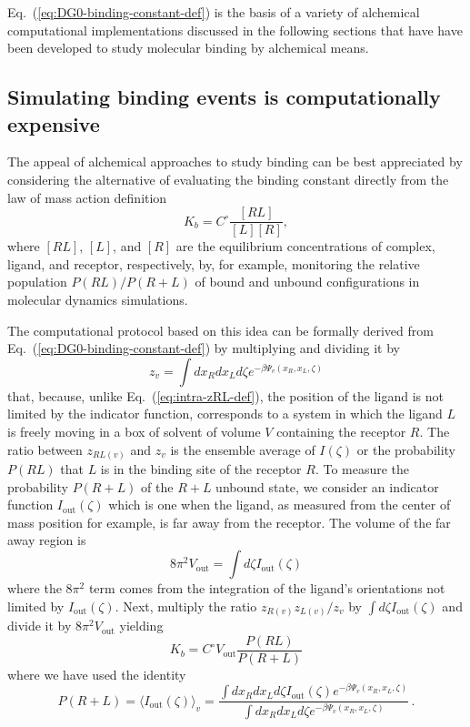 \documentclass[9pt,bestpractices]{livecoms}
\begin{document}
Eq.~(\ref{eq:DG0-binding-constant-def}) is the basis of a variety of alchemical computational implementations discussed in the following sections that have have been developed to study molecular binding by alchemical means.

\subsection{Simulating binding events is computationally expensive}

The appeal of alchemical approaches to study binding can be best appreciated by considering the alternative of evaluating the binding constant directly from the law of mass action definition
\begin{equation}\label{eq:law-mass-action}
 K_b = C^{\circ}\frac{[RL]}{[L][R]},
\end{equation}
where $[RL]$, $[L]$, and $[R]$ are the equilibrium concentrations of complex, ligand, and receptor, respectively, by, for example, monitoring the relative population $P(RL)/P(R+L)$ of bound and unbound configurations in molecular dynamics simulations.~\cite{jong2011determining,pan2017quantitative}

The computational protocol based on this idea can be formally derived from Eq.~(\ref{eq:DG0-binding-constant-def}) by multiplying and dividing it by
\begin{equation}
z_v = \int dx_R dx_L d\zeta e^{-\beta \Psi_v(x_R, x_L, \zeta)}
\end{equation}
that, because, unlike Eq.~(\ref{eq:intra-zRL-def}), the position of the ligand is not limited by the indicator function, corresponds to a system in which the ligand $L$ is freely moving in a box of solvent of volume $V$ containing the receptor $R$. The ratio between $z_{RL(v)}$ and $z_v$ is the ensemble average of $I(\zeta)$ or the probability $P(RL)$ that $L$ is in the binding site of the receptor $R$. To measure the probability $P(R+L)$ of the $R+L$ unbound state, we consider an indicator function $I_{\mathrm{out}}(\zeta)$ which is one when the ligand, as measured from the center of mass position for example, is far away from the receptor. The volume of the far away region is
\begin{equation}
8 \pi^2 V_{\mathrm{out}} = \int d\zeta I_{\mathrm{out}}(\zeta)
\end{equation}
where the $8 \pi^2$ term comes from the integration of the ligand's orientations not limited by $I_{\mathrm{out}}(\zeta)$. Next, multiply the ratio $z_{R(v)} z_{L(v)}/z_v$ by $\int d\zeta I_{\mathrm{out}}(\zeta)$ and divide it by $8 \pi^2 V_{\mathrm{out}}$ yielding
\begin{equation}
K_b = C^\circ V_{\mathrm{out}} \frac{P(RL)}{P(R+L)}
\end{equation}
where we have used the identity
\begin{equation}
P(R+L) = \langle I_{\mathrm{out}}(\zeta) \rangle_v = \frac{\int dx_R dx_L d\zeta I_{\mathrm{out}}(\zeta) e^{-\beta \Psi_v(x_R, x_L, \zeta)}}{\int dx_R dx_L d\zeta e^{-\beta \Psi_v(x_R, x_L, \zeta)}} \, .
\end{equation}
\end{document}
